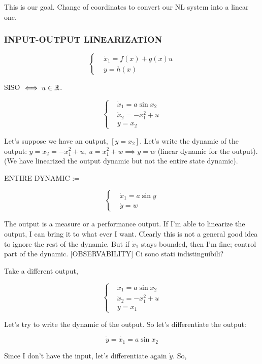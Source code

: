 This is our goal. Change of coordinates to convert our NL system into a linear one.

\subsubsection{INPUT-OUTPUT LINEARIZATION}

\[
	\left\{
	\begin{aligned}
	&\dot{x}_1 = f(x) + g(x)u \\
	&y = h(x)
	\end{aligned}
	\right.
\]

SISO $\iff u \in \mathbb{R}$.

\[
	\left\{
	\begin{aligned}
	&\dot{x}_1 = a\sin{x}_2 \\
	&\dot{x}_2 = -x_1^2 + u \\
	&y=x_2
	\end{aligned}
	\right.
\]

Let's suppose we have an output, $[y=x_2]$. Let's write the dynamic of the output: $\dot{y}=\dot{x}_2 = -x_1^2 + u,\ u = x_1^2 + w \implies \dot{y}=w$ (linear dynamic for the output). (We have linearized the output dynamic but not the entire state dynamic).

ENTIRE DYNAMIC :=

\[
	\left\{
	\begin{aligned}
	&\dot{x}_1 = a\sin{y} \\
	&\dot{y} = w
	\end{aligned}
	\right.
\]

The output is a measure or a performance output. If I'm able to linearize the output, I can bring it to what ever I want. Clearly this is not a general good idea to ignore the rest of the dynamic. But if $\dot{x}_1$ stays bounded, then I'm fine; control part of the dynamic. [OBSERVABILITY] Ci sono stati indistinguibili?

Take a different output,

\[
	\left\{
	\begin{aligned}
	&\dot{x}_1 = a\sin{x_2} \\
	&\dot{x}_2 = -x_1^2 + u \\
	&y = x_1
	\end{aligned}
	\right.
\]

Let's try to write the dynamic of the output. So let's differentiate the output:

\[
	\dot{y} = \dot{x_1} = a\sin{x_2}
\]

Since I don't have the input, let's differentiate again $\dot{y}$. So,


